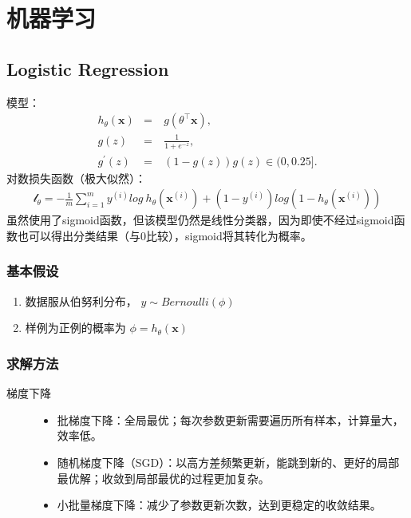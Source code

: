 \documentclass[letterpaper,10pt,english]{sphinxmanual}
\begin{document}
\chapter{机器学习}
\label{\detokenize{machineLearning/index::doc}}\label{\detokenize{machineLearning/index:id1}}

\section{Logistic Regression}
\label{\detokenize{machineLearning/01_lr:logistic-regression}}\label{\detokenize{machineLearning/01_lr::doc}}
模型：
\begin{equation*}
\begin{split}h_\theta(\mathbf{x}) & = & \  g(\theta^\top \mathbf{x}),\\
g(z) & = & \  \frac{1}{1+e^{-z}},\\
g^\prime(z) & = & \  (1-g(z))g(z) \in (0, 0.25].\end{split}
\end{equation*}
对数损失函数（极大似然）：
\begin{equation*}
\begin{split}\mathcal{l}_\theta = -\frac{1}{m} \sum_{i=1}^m y^{(i)}log\  h_\theta(\mathbf{x}^{(i)}) + (1 - y^{(i)})log(1 - h_\theta(\mathbf{x}^{(i)}))\end{split}
\end{equation*}
虽然使用了sigmoid函数，但该模型仍然是线性分类器，因为即使不经过sigmoid函数也可以得出分类结果（与0比较），sigmoid将其转化为概率。


\subsection{基本假设}
\label{\detokenize{machineLearning/01_lr:id1}}\begin{enumerate}
\item {} 
数据服从伯努利分布， \(y \sim Bernoulli(\phi)\)

\item {} 
样例为正例的概率为 \(\phi=h_\theta(\mathbf{x})\)

\end{enumerate}


\subsection{求解方法}
\label{\detokenize{machineLearning/01_lr:id2}}\begin{description}
\item[{梯度下降}] \leavevmode\begin{itemize}
\item {} 
批梯度下降：全局最优；每次参数更新需要遍历所有样本，计算量大，效率低。

\item {} 
随机梯度下降（SGD）：以高方差频繁更新，能跳到新的、更好的局部最优解；收敛到局部最优的过程更加复杂。

\item {} 
小批量梯度下降：减少了参数更新次数，达到更稳定的收敛结果。

\end{itemize}

\end{description}
\end{document}

